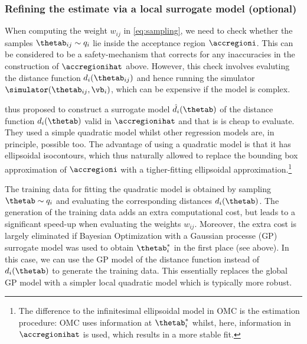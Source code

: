 \subsubsection*{Refining the estimate via a local surrogate model (optional)}
When computing the weight $w_{ij}$ in \eqref{eq:sampling}, we need to
check whether the samples $\thetab_{ij} \sim q_i$ lie inside the
acceptance region $\accregioni$. This can be considered to be a
safety-mechanism that corrects for any inaccuracies in the
construction of $\accregionihat$ above. However, this check involves
evaluting the distance function $d_i(\thetab_{ij})$ and hence running
the simulator $\simulator(\thetab_{ij}, \vb_i)$, which can be
expensive if the model is complex.

\citet{Ikonomov2019} thus proposed to construct a surrogate model $\hat{d}_i(\thetab)$
of the distance function $d_i(\thetab)$ valid in $\accregionihat$ and
that is is cheap to evaluate. They used a simple quadratic model
whilst other regression models are, in principle, possible too. The
advantage of using a quadratic model is that it has ellipsoidal
isocontours, which thus naturally allowed \citet{Ikonomov2019} to
replace the bounding box approximation of $\accregioni$ with a
tigher-fitting ellipsoidal approximation.\footnote{The difference to
the infinitesimal ellipsoidal model in OMC is the estimation procedure: OMC uses
information at $\thetab_i^*$ whilst, here, information in
$\accregionihat$ is used, which results in a more stable fit.}

The training data for fitting the quadratic model is obtained by
sampling $\thetab \sim q_i$ and evaluating the corresponding distances
$d_i(\thetab)$. The generation of the training data adds an extra
computational cost, but leads to a significant speed-up when
evaluating the weights $w_{ij}$. Moreover, the extra cost is largely
eliminated if Bayesian Optimization with a Gaussian processe (GP)
surrogate model was used to obtain $\thetab_i^*$ in the first place
(see above). In this case, we can use the GP model of the distance
function instead of $d_i(\thetab)$ to generate the training data. This
essentially replaces the global GP model with a simpler local
quadratic model which is typically more robust.